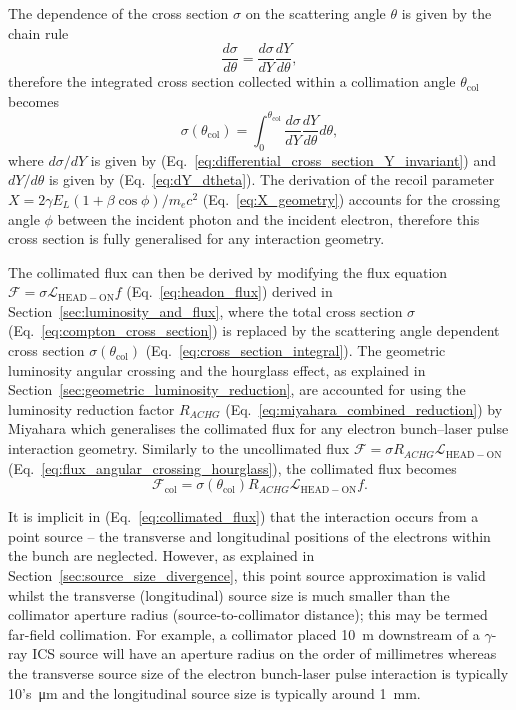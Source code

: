 \documentclass[../main.tex]{subfiles}
\begin{document}
The dependence of the cross section $\sigma$ on the scattering angle $\theta$ is given by the chain rule
\begin{equation}
\frac{d\sigma}{d\theta} = \frac{d\sigma}{dY}\frac{dY}{d\theta},
\label{eq:cross_section_chain_rule}
\end{equation}
therefore the integrated cross section collected within a collimation angle $\theta_{\mathrm{col}}$ becomes
\begin{equation}
\sigma\left(\theta_{\mathrm{col}}\right) = \int_{0}^{\theta_{\mathrm{col}}}\frac{d\sigma}{dY}\frac{dY}{d\theta}d\theta,
\label{eq:cross_section_integral}
\end{equation} 
where $d\sigma/dY$ is given by (Eq.~\ref{eq:differential_cross_section_Y_invariant}) and $dY/d\theta$ is given by (Eq.~\ref{eq:dY_dtheta}). The derivation of the recoil parameter $X = 2\gamma E_{L}\left(1+\beta\cos\phi\right)/m_{e}c^{2}$ (Eq.~\ref{eq:X_geometry}) accounts for the crossing angle $\phi$ between the incident photon and the incident electron, therefore this cross section is fully generalised for any interaction geometry.

The collimated flux can then be derived by modifying the flux equation $\mathcal{F} = \sigma\mathcal{L}_{\mathrm{HEAD-ON}}f$ (Eq.~\ref{eq:headon_flux}) derived in Section~\ref{sec:luminosity_and_flux}, where the total cross section $\sigma$ (Eq.~\ref{eq:compton_cross_section}) is replaced by the scattering angle dependent cross section $\sigma\left(\theta_{\mathrm{col}}\right)$ (Eq.~\ref{eq:cross_section_integral}). The geometric luminosity angular crossing and the hourglass effect, as explained in Section~\ref{sec:geometric_luminosity_reduction}, are accounted for using the luminosity reduction factor $R_{ACHG}$ (Eq.~\ref{eq:miyahara_combined_reduction}) by Miyahara \cite{miyahara2008luminosity} which generalises the collimated flux for any electron bunch--laser pulse interaction geometry. Similarly to  the uncollimated flux $\mathcal{F} = \sigma R_{ACHG}\mathcal{L}_{\mathrm{HEAD-ON}}$ (Eq.~\ref{eq:flux_angular_crossing_hourglass}), the collimated flux becomes
\begin{equation}
\mathcal{F}_{\mathrm{col}} = \sigma\left(\theta_{\mathrm{col}}\right) R_{ACHG}\mathcal{L}_{\mathrm{HEAD-ON}}f.
\label{eq:collimated_flux}
\end{equation}

It is implicit in (Eq.~\ref{eq:collimated_flux}) that the interaction occurs from a point source -- the transverse and longitudinal positions of the electrons within the bunch are neglected. However, as explained in Section~\ref{sec:source_size_divergence}, this point source approximation is valid whilst the transverse (longitudinal) source size is much smaller than the collimator aperture radius (source-to-collimator distance); this may be termed far-field collimation. For example, a collimator placed 10~\si{\meter} downstream of a $\gamma$-ray ICS source will have an aperture radius on the order of millimetres whereas the transverse source size of the electron bunch-laser pulse interaction is typically 10's~\si{\micro\meter} and the longitudinal source size is typically around 1~\si{\milli\meter}. 
\end{document}
